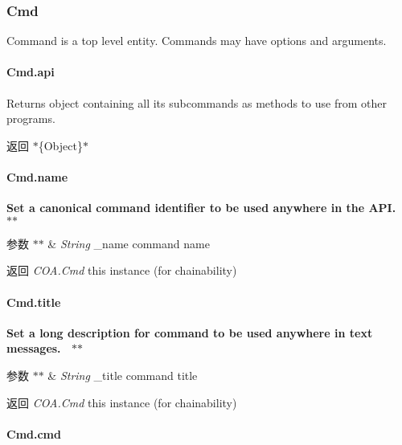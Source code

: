 \subsubsection*{Cmd}

Command is a top level entity. Commands may have options and arguments.

\paragraph*{Cmd.\+api}

Returns object containing all its subcommands as methods to use from other programs.~\newline
 {\bfseries \begin{DoxyReturn}{返回}
$\ast$\{Object\}$\ast$
\end{DoxyReturn}
\paragraph*{Cmd.\+name}}

{\bfseries  Set a canonical command identifier to be used anywhere in the A\+PI.~\newline
 $\ast$$\ast$
\begin{DoxyParams}{参数}
{\em $\ast$$\ast$} & {\itshape String} {\ttfamily \+\_\+name} command name~\newline
 {\bfseries }\\
\hline
\end{DoxyParams}
\begin{DoxyReturn}{返回}
{\bfseries } {\itshape C\+O\+A.\+Cmd} {\ttfamily this} instance (for chainability)
\end{DoxyReturn}
\paragraph*{Cmd.\+title}}

{\bfseries  Set a long description for command to be used anywhere in text messages.~\newline
 $\ast$$\ast$
\begin{DoxyParams}{参数}
{\em $\ast$$\ast$} & {\itshape String} {\ttfamily \+\_\+title} command title~\newline
 {\bfseries }\\
\hline
\end{DoxyParams}
\begin{DoxyReturn}{返回}
{\bfseries } {\itshape C\+O\+A.\+Cmd} {\ttfamily this} instance (for chainability)
\end{DoxyReturn}
\paragraph*{Cmd.\+cmd}}

